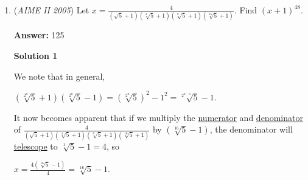 \begin{enumerate}
 
 \textbf{Answer: }392



\textbf{Solution 1}

Since a card from B is placed on the bottom of the new stack, notice that cards from pile B will be marked as an even number in the new pile, while cards from pile A will be marked as odd in the new pile. Since 131 is odd and retains its original position in the stack, it must be in pile A. Also to retain its original position, exactly $131 - 1 = 130$ numbers must be in front of it. There are $\frac{130}{2} = 65$ cards from each of piles A, B in front of card 131. This suggests that $n = 131 + 65 = 196$; the total number of cards is $196 \cdot 2 = \boxed{392}$.

 



\textbf{Solution 2}

If you index the final stack $1,2,\dots,2n$, you notice that pile A resides only in the odd indices and has maintained its original order aside from flipping over. The same has happened to pile B except replace odd with even. Thus, if 131 is still at index 131, an odd number, then 131 must be from pile A. The numbers in pile A are the consecutive integers $1,2,\dots, n$. This all leads us to the following equation.
 \[131=2n-2(131)+1\implies2n=\boxed{392}\]



	\item (\textit{AIME II 2005}) Let $x=\frac{4}{(\sqrt{5}+1)(\sqrt[4]{5}+1)(\sqrt[8]{5}+1)(\sqrt[16]{5}+1)}.$ Find $(x+1)^{48}.$

 \textbf{Answer: }125



\textbf{Solution 1}

We note that in general,

 ${} (\sqrt[2^n]{5} + 1)(\sqrt[2^n]{5} - 1) = (\sqrt[2^n]{5})^2 - 1^2 = \sqrt[2^{n-1}]{5} - 1$.

 

 It now becomes apparent that if we multiply the \href{https://artofproblemsolving.com/wiki/index.php?title=Numerator}{numerator} and \href{https://artofproblemsolving.com/wiki/index.php?title=Denominator}{denominator} of $\frac{4}{ (\sqrt{5}+1) (\sqrt[4]{5}+1) (\sqrt[8]{5}+1) (\sqrt[16]{5}+1) }$ by $(\sqrt[16]{5} - 1)$, the denominator will \href{https://artofproblemsolving.com/wiki/index.php?title=Telescope}{telescope} to $\sqrt[1]{5} - 1 = 4$, so 

 $x = \frac{4(\sqrt[16]{5} - 1)}{4} = \sqrt[16]{5} - 1$.


\end{enumerate}
